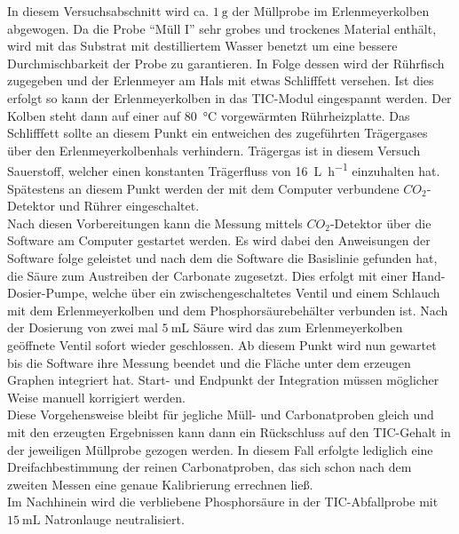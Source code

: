 In diesem Versuchsabschnitt wird ca. $\SI{1}{\gram}$ der Müllprobe im Erlenmeyerkolben abgewogen. Da die Probe "`Müll I"' sehr grobes und trockenes Material enthält, wird mit das Substrat mit destilliertem Wasser benetzt um eine bessere Durchmischbarkeit der Probe zu garantieren. In Folge dessen wird der Rührfisch zugegeben und der Erlenmeyer am Hals mit etwas Schlifffett versehen. Ist dies erfolgt so kann der Erlenmeyerkolben in das TIC-Modul eingespannt werden. Der Kolben steht dann auf einer auf \SI{80}{\degreeCelsius} vorgewärmten Rührheizplatte. Das Schlifffett sollte an diesem Punkt ein entweichen des zugeführten Trägergases über den Erlenmeyerkolbenhals verhindern. Trägergas ist in diesem Versuch Sauerstoff, welcher einen konstanten Trägerfluss von \SI{16}{\liter \per \hour} einzuhalten hat. Spätestens an diesem Punkt werden der mit dem Computer verbundene $CO_2$-Detektor und Rührer eingeschaltet.\\
Nach diesen Vorbereitungen kann die Messung mittels $CO_2$-Detektor über die Software am Computer gestartet werden. Es wird dabei den Anweisungen der Software folge geleistet und nach dem die Software die Basislinie gefunden hat, die Säure zum Austreiben der Carbonate zugesetzt. Dies erfolgt mit einer Hand-Dosier-Pumpe, welche über ein zwischengeschaltetes Ventil und einem Schlauch mit dem Erlenmeyerkolben und dem Phosphorsäurebehälter verbunden ist. Nach der Dosierung von zwei mal $\SI{5}{\milli \liter}$ Säure wird das zum Erlenmeyerkolben geöffnete Ventil sofort wieder geschlossen. Ab diesem Punkt wird nun gewartet bis die Software ihre Messung beendet und die Fläche unter dem erzeugen Graphen integriert hat. Start- und Endpunkt der Integration müssen möglicher Weise manuell korrigiert werden.\\
Diese Vorgehensweise bleibt für jegliche Müll- und Carbonatproben gleich und mit den erzeugten Ergebnissen kann dann ein Rückschluss auf den TIC-Gehalt in der jeweiligen Müllprobe gezogen werden.
In diesem Fall erfolgte lediglich eine Dreifachbestimmung der reinen Carbonatproben, das sich schon nach dem zweiten Messen eine genaue Kalibrierung errechnen ließ.\\
Im Nachhinein wird die verbliebene Phosphorsäure in der TIC-Abfallprobe mit $\SI{15}{\milli \liter}$ Natronlauge neutralisiert.

